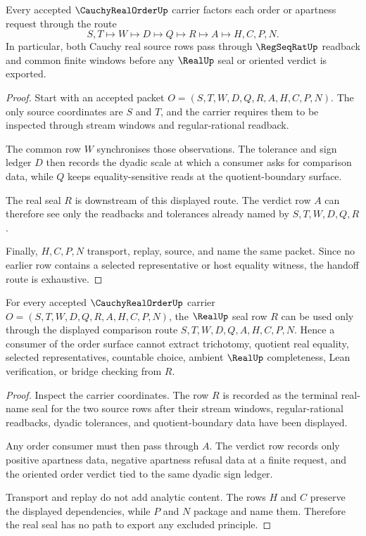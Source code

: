 \begin{theorem}
\label{thm:cauchy-real-order-regseqrat-handoff}
Every accepted $\CauchyRealOrderUp$ carrier factors each order or apartness request through the route
$$
S,T \longmapsto W \longmapsto D \longmapsto Q \longmapsto R \longmapsto A \longmapsto H,C,P,N .
$$
In particular, both Cauchy real source rows pass through $\RegSeqRatUp$ readback and common finite windows before any $\RealUp$ seal or oriented verdict is exported.
\end{theorem}
\begin{proof}
Start with an accepted packet $O=(S,T,W,D,Q,R,A,H,C,P,N)$. The only source coordinates are $S$ and $T$, and the carrier requires them to be inspected through stream windows and regular-rational readback.

The common row $W$ synchronises those observations. The tolerance and sign ledger $D$ then records the dyadic scale at which a consumer asks for comparison data, while $Q$ keeps equality-sensitive reads at the quotient-boundary surface.

The real seal $R$ is downstream of this displayed route. The verdict row $A$ can therefore see only the readbacks and tolerances already named by $S,T,W,D,Q,R$.

Finally, $H,C,P,N$ transport, replay, source, and name the same packet. Since no earlier row contains a selected representative or host equality witness, the handoff route is exhaustive.
\end{proof}

\begin{theorem}
\label{thm:cauchy-real-order-real-seal-nonescape}
For every accepted $\CauchyRealOrderUp$ carrier $O=(S,T,W,D,Q,R,A,H,C,P,N)$, the $\RealUp$ seal row $R$ can be used only through the displayed comparison route $S,T,W,D,Q,A,H,C,P,N$. Hence a consumer of the order surface cannot extract trichotomy, quotient real equality, selected representatives, countable choice, ambient $\RealUp$ completeness, Lean verification, or bridge checking from $R$.
\end{theorem}
\begin{proof}
Inspect the carrier coordinates. The row $R$ is recorded as the terminal real-name seal for the two source rows after their stream windows, regular-rational readbacks, dyadic tolerances, and quotient-boundary data have been displayed.

Any order consumer must then pass through $A$. The verdict row records only positive apartness data, negative apartness refusal data at a finite request, and the oriented order verdict tied to the same dyadic sign ledger.

Transport and replay do not add analytic content. The rows $H$ and $C$ preserve the displayed dependencies, while $P$ and $N$ package and name them. Therefore the real seal has no path to export any excluded principle.
\end{proof}


